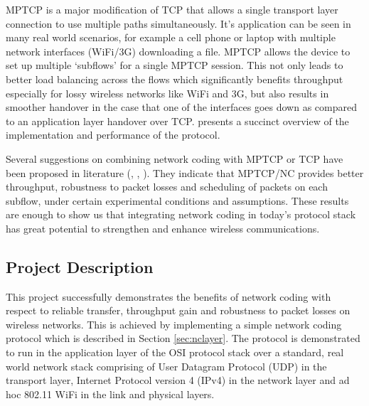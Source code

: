\documentclass[12pt,a4paper,twoside,openright]{report}
\begin{document}
MPTCP is a major modification of TCP that allows a single transport layer connection to use multiple paths simultaneously. It's application can be seen in many real world scenarios, for example a cell phone or laptop with multiple network interfaces (WiFi/3G) downloading a file. MPTCP allows the device to set up multiple `subflows' for a single MPTCP session. This not only leads to better load balancing across the flows which significantly benefits throughput especially for lossy wireless networks like WiFi and 3G, but also results in smoother handover in the case that one of the interfaces goes down as compared to an application layer handover over TCP. \cite{mptcp-over} presents a succinct overview of the implementation and performance of the protocol.  

Several suggestions on combining network coding with MPTCP or TCP have been proposed in literature (\cite{mptcp-nc-mesh}, \cite{mptcpnc}, \cite{tcpnc}). They indicate that MPTCP/NC provides better throughput, robustness to packet losses and scheduling of packets on each subflow, under certain experimental conditions and assumptions. These results are enough to show us that integrating network coding in today's protocol stack has great potential to strengthen and enhance wireless communications. 

\subsection{Project Description}


This project successfully demonstrates the benefits of network coding with respect to reliable transfer, throughput gain and robustness to packet losses on wireless networks. This is achieved by implementing a simple network coding protocol which is described in Section \ref{sec:nclayer}. The protocol is demonstrated to run in the application layer of the OSI protocol stack over a standard, real world network stack comprising of User Datagram Protocol (UDP) in the transport layer, Internet Protocol version 4 (IPv4) in the network layer and ad hoc 802.11 WiFi in the link and physical layers. 
\end{document}

